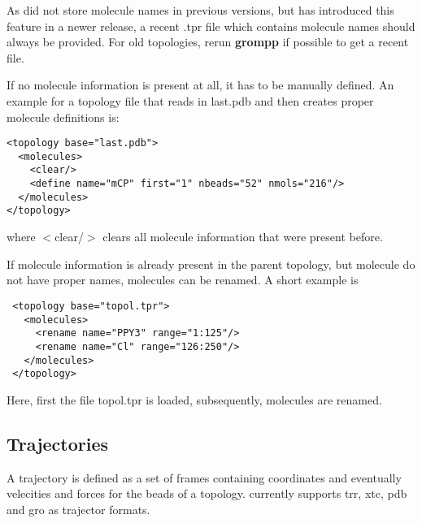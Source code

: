 As \gromacs did not store molecule names in previous versions, but has introduced this feature in a newer release,  a recent .tpr file which contains molecule names should always be provided. For old topologies, rerun \gromacs \textbf{grompp} if possible to get a recent file.

If no molecule information is present at all, it has to be manually defined. An example for a topology file that reads in last.pdb and then creates proper molecule definitions is:
\begin{lstlisting}
<topology base="last.pdb">
  <molecules>
    <clear/>
    <define name="mCP" first="1" nbeads="52" nmols="216"/>
  </molecules>
</topology>
\end{lstlisting}
where $<$clear/$>$ clears all molecule information that were present before.

If molecule information is already present in the parent topology, but molecule do not have proper names, molecules can be renamed. A short example is
\begin{lstlisting}
 <topology base="topol.tpr">
   <molecules>
     <rename name="PPY3" range="1:125"/>
     <rename name="Cl" range="126:250"/>
   </molecules>
 </topology>
\end{lstlisting}
Here, first the file topol.tpr is loaded, subsequently, molecules are renamed.

\subsection{Trajectories}
A trajectory is defined as a set of frames containing coordinates and eventually velecities and forces for the beads of a topology.
\votca currently supports trr, xtc, pdb and gro as trajector formats.






